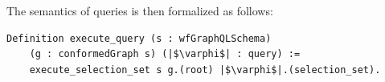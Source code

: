 The semantics of queries is then formalized as follows:
\begin{verbatim}
Definition execute_query (s : wfGraphQLSchema)
    (g : conformedGraph s) (|$\varphi$| : query) :=
    execute_selection_set s g.(root) |$\varphi$|.(selection_set).
\end{verbatim}








